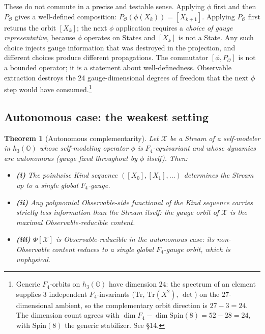 \documentclass[12pt]{article}
\newtheorem{theorem}{Theorem}
\theoremstyle{remark}
\newcommand{\hthree}{h_3(\mathbb{O})}
\newcommand{\Ffour}{F_4}
\newcommand{\Phiexp}{\Phi}
\newcommand{\Stream}{\mathcal{X}}
\newcommand{\Tr}{\mathrm{Tr}}
\begin{document}
These do not commute in a precise and testable sense. Applying $\phi$
first and then $P_\mathcal{O}$ gives a well-defined composition:
$P_\mathcal{O}(\phi(X_k)) = [X_{k+1}]$. Applying $P_\mathcal{O}$ first
returns the orbit $[X_k]$; the next $\phi$ application requires a
\emph{choice of gauge representative}, because $\phi$ operates on States
and $[X_k]$ is not a State. Any such choice injects gauge information
that was destroyed in the projection, and different choices produce
different propagations. The commutator
$[\phi, P_\mathcal{O}]$ is not a bounded operator; it is a statement
about well-definedness. Observable extraction destroys the 24
gauge-dimensional degrees of freedom that the next $\phi$ step would have
consumed.\footnote{Generic $\Ffour$-orbits on $\hthree$ have dimension
$24$: the spectrum of an element supplies $3$ independent
$\Ffour$-invariants ($\Tr$, $\Tr(X^2)$, $\det$) on the $27$-dimensional
ambient, so the complementary orbit direction is $27 - 3 = 24$. The
dimension count agrees with $\dim \Ffour - \dim \mathrm{Spin}(8) =
52 - 28 = 24$, with $\mathrm{Spin}(8)$ the generic stabilizer. See
\cite{harvey1990} \S14.}

\subsection{Autonomous case: the weakest setting}
\label{sec:autonomous-complementarity}

\begin{theorem}[Autonomous complementarity]\label{thm:autonomous-comp}
Let $\Stream$ be a Stream of a self-modeler in $\hthree$ whose
self-modeling operator $\phi$ is $\Ffour$-equivariant and whose dynamics
are autonomous (gauge fixed throughout by $\phi$ itself). Then:
\begin{itemize}[leftmargin=2em]
\item \textbf{(i)} The pointwise Kind sequence $([X_0], [X_1], \ldots)$
determines the Stream up to a single global $\Ffour$-gauge.
\item \textbf{(ii)} Any polynomial Observable-side functional of the
Kind sequence carries strictly less information than the Stream itself:
the gauge orbit of $\Stream$ is the maximal Observable-reducible content.
\item \textbf{(iii)} $\Phiexp[\Stream]$ is Observable-reducible in
the autonomous case: its non-Observable content reduces to a single
global $\Ffour$-gauge orbit, which is unphysical.
\end{itemize}
\end{theorem}
\end{document}
